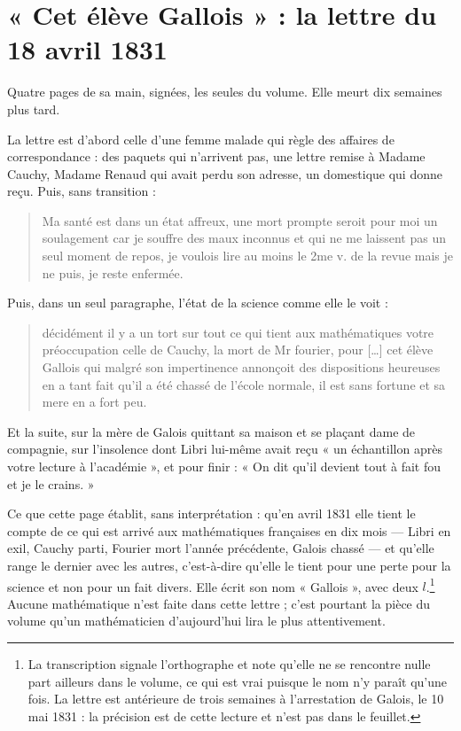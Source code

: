 \documentclass[11pt,a4paper]{article}
\begin{document}
\section*{« Cet élève Gallois » : la lettre du 18 avril 1831}

Quatre pages de sa main, signées, les seules du volume. Elle meurt dix
semaines plus tard.

La lettre est d'abord celle d'une femme malade qui règle des affaires de
correspondance : des paquets qui n'arrivent pas, une lettre remise à Madame
Cauchy, Madame Renaud qui avait perdu son adresse, un domestique qui donne
reçu. Puis, sans transition :
\begin{quote}
Ma santé est dans un état affreux, une mort prompte seroit pour moi un
soulagement car je souffre des maux inconnus et qui ne me laissent pas un seul
moment de repos, je voulois lire au moins le 2me v. de la revue mais je ne
puis, je reste enfermée.
\end{quote}
Puis, dans un seul paragraphe, l'état de la science comme elle le voit :
\begin{quote}
décidément il y a un tort sur tout ce qui tient aux mathématiques votre
préoccupation celle de Cauchy, la mort de Mr fourier, pour […] cet élève
Gallois qui malgré son impertinence annonçoit des dispositions heureuses en a
tant fait qu'il a été chassé de l'école normale, il est sans fortune et sa mere
en a fort peu.
\end{quote}
Et la suite, sur la mère de Galois quittant sa maison et se plaçant dame de
compagnie, sur l'insolence dont Libri lui-même avait reçu « un échantillon
après votre lecture à l'académie », et pour finir : « On dit qu'il devient tout
à fait fou et je le crains. »

Ce que cette page établit, sans interprétation : qu'en avril 1831 elle tient le
compte de ce qui est arrivé aux mathématiques françaises en dix mois --- Libri
en exil, Cauchy parti, Fourier mort l'année précédente, Galois chassé --- et
qu'elle range le dernier avec les autres, c'est-à-dire qu'elle le tient pour une
perte pour la science et non pour un fait divers. Elle écrit son nom
« Gallois », avec deux $l$.\footnote{La transcription signale l'orthographe et
note qu'elle ne se rencontre nulle part ailleurs dans le volume, ce qui est
vrai puisque le nom n'y paraît qu'une fois. La lettre est antérieure de trois
semaines à l'arrestation de Galois, le 10 mai 1831 : la précision est de cette
lecture et n'est pas dans le feuillet.} Aucune mathématique n'est faite dans
cette lettre ; c'est pourtant la pièce du volume qu'un mathématicien
d'aujourd'hui lira le plus attentivement.
\end{document}
